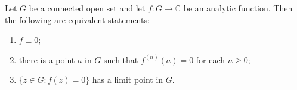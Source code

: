 Let $G$ be a connected open set and let $f: G \to \mathbb{C}$ be an analytic function. Then the following are equivalent statements:

\begin{enumerate}
\item[(a)] $f \equiv 0$;
\item[(b)] there is a point $a$ in $G$ such that $f^{(n)}(a) = 0$ for each $n \geq 0$;
\item[(c)] $\{ z \in G : f(z) = 0 \}$ has a limit point in $G$.
\end{enumerate}
